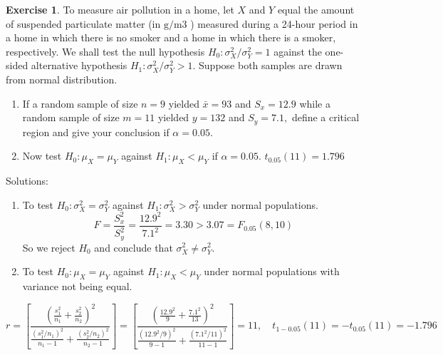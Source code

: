 \documentclass[
]{book}
\theoremstyle{definition}
\theoremstyle{definition}
\theoremstyle{definition}
\newtheorem{exercise}{Exercise}[chapter]
\theoremstyle{remark}
\begin{document}
\begin{exercise}
\protect\hypertarget{exr:q71}{}{\label{exr:q71} }To measure air pollution in a home, let \(X\) and \(Y\) equal the amount of suspended particulate matter (in \(\mathrm{g} / \mathrm{m} 3\) ) measured during a 24-hour period in a home in which there is no smoker and a home in which there is a smoker, respectively. We shall test the null hypothesis \(H_{0}: \sigma_{X}^{2} / \sigma_{Y}^{2}=1\) against the one-sided alternative hypothesis \(H_{1}: \sigma_{X}^{2} / \sigma_{Y}^{2}>1\). Suppose both samples are drawn from normal distribution.

\begin{enumerate}
\def\labelenumi{\arabic{enumi}.}
\item
  If a random sample of size \(n=9\) yielded \(\bar{x}=93\) and \(S_{x}=12.9\) while a random sample of size \(m=11\) yielded \(y=132\) and \(S_{y}=7.1,\) define a critical region and give your conclusion if \(\alpha=0.05\).
\item
  Now test \(H_{0}: \mu_{X}=\mu_{Y}\) against \(H_{1}: \mu_{X}<\mu_{Y}\) if \(\alpha=0.05\). \(t_{0.05}(11)=1.796\)
\end{enumerate}
\end{exercise}

Solutions:\\

\begin{enumerate}
\def\labelenumi{\arabic{enumi}.}
\item
  To test \(H_0:\sigma_X^2=\sigma_Y^2\) against \(H_1:\sigma^2_X>\sigma_Y^2\) under normal populations.\\
  \begin{equation}
  F=\frac{S_{x}^{2}}{S_{y}^{2}}=\frac{12.9^{2}}{7.1^{2}}=3.30>3.07=F_{0.05}(8,10)
  \end{equation}
  So we reject \(H_0\) and conclude that \(\sigma_X^2\neq\sigma_Y^2\).
\item
  To test \(H_0:\mu_X=\mu_Y\) against \(H_1:\mu_X<\mu_Y\) under normal populations with variance not being equal.
\end{enumerate}

\begin{equation}
r=\left[\frac{\left(\frac{s_{1}^{2}}{n_{1}}+\frac{s_{2}^{2}}{n_{2}}\right)^{2}}{\frac{\left(s_{1}^{2} / n_{1}\right)^{2}}{n_{1}-1}+\frac{\left(s_{2}^{2} / n_{2}\right)^{2}}{n_{2}-1}}\right]=\left[\frac{\left(\frac{12.9^{2}}{9}+\frac{7.1^{2}}{13}\right)^{2}}{\frac{\left(12.9^{2} / 9\right)^{2}}{9-1}+\frac{\left(7.1^{2} / 11\right)^{2}}{11-1}}\right]=11, \quad t_{1-0.05}(11)=-t_{0.05}(11)=-1.796
\end{equation}
\end{document}
